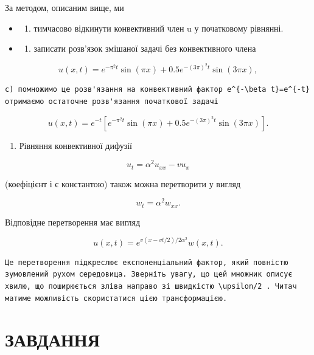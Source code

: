 \documentclass[
  ukrainian,
]{article}
\providecommand{\tightlist}{%
  \setlength{\itemsep}{0pt}\setlength{\parskip}{0pt}}
\begin{document}
За методом, описаним вище, ми

\begin{itemize}
\tightlist
\item
  \begin{enumerate}
  \def\labelenumi{\alph{enumi})}
  \tightlist
  \item
    тимчасово відкинути конвективний член u у початковому рівнянні.
  \end{enumerate}
\item
  \begin{enumerate}
  \def\labelenumi{\alph{enumi})}
  \setcounter{enumi}{1}
  \tightlist
  \item
    записати розв'язок змішаної задачі без конвективного члена
  \end{enumerate}
\end{itemize}

\[
u(x, t) = e^{-\pi^2 t} \sin(\pi x) + 0.5e^{-(3\pi)^2 t} \sin(3\pi x),
\]

\begin{verbatim}
c) помножимо це розв'язання на конвективний фактор e^{-\beta t}=e^{-t} отримаємо остаточне розв'язання початкової задачі
\end{verbatim}

\[
u(x, t) = e^{-t} \left[ e^{-\pi^2 t} \sin(\pi x) + 0.5e^{-(3\pi)^2 t} \sin(3\pi x) \right].
\]

\begin{enumerate}
\def\labelenumi{\arabic{enumi}.}
\setcounter{enumi}{1}
\tightlist
\item
  Рівняння конвективної дифузії
\end{enumerate}

\[
u_t = \alpha^2 u_{xx} - v u_x
\]

(коефіцієнт і є константою) також можна перетворити у вигляд

\[
w_t = \alpha^2 w_{xx}.
\]

Відповідне перетворення має вигляд

\[
u(x, t) = e^{v(x-vt/2)/2\alpha^2}w(x, t).
\]

\begin{verbatim}
Це перетворення підкреслює експоненціальний фактор, який повністю зумовлений рухом середовища. Зверніть увагу, що цей множник описує хвилю, що поширюється зліва направо зі швидкістю \upsilon/2 . Читач матиме можливість скористатися цією трансформацією.
\end{verbatim}

\section{ЗАВДАННЯ}\label{ux437ux430ux432ux434ux430ux43dux43dux44f-6}
\end{document}
